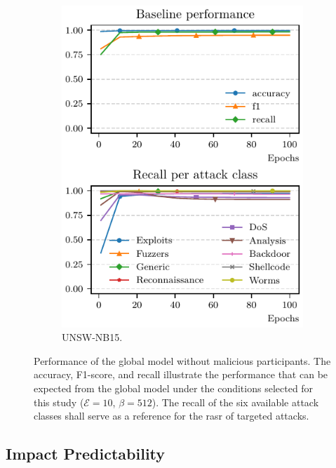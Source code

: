 \begin{figure}
\begin{subfigure}{.45\linewidth}
    \includegraphics[width=\linewidth]{figures/nb15/baseline}
    \caption{
      UNSW-NB15.
      \label{fig:assess.baseline.nb15}
    }
  \end{subfigure}
  \caption{
    Performance of the global model without malicious participants.
    The accuracy, F1-score, and recall illustrate the performance that can be expected from the global model under the conditions selected for this study ($\mathcal{E}=10$, $\beta=512$).
    The recall of the six available attack classes shall serve as a reference for the \gls{rasr} of targeted attacks.
    \label{fig:assess.baseline}
  }
\end{figure}



\subsection{Impact Predictability\label{sec:results.predictability}}

